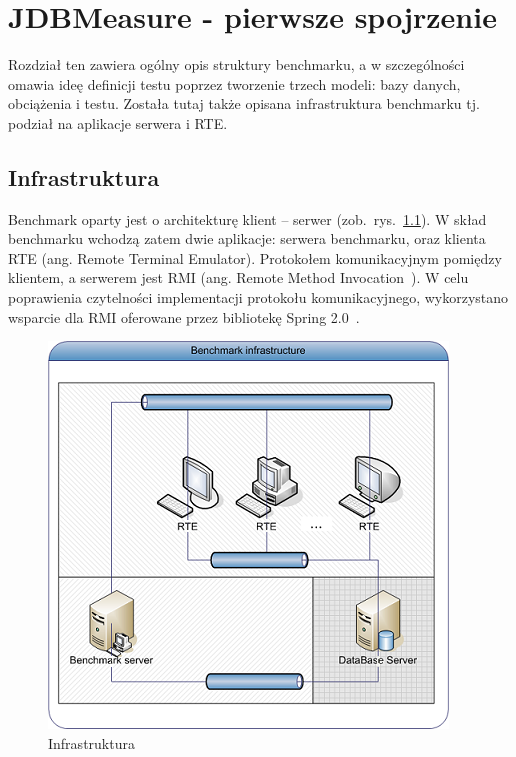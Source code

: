 \chapter{JDBMeasure - pierwsze spojrzenie}\label{rodz:over}
Rozdział ten zawiera ogólny opis struktury benchmarku, a w szczególności omawia ideę
definicji testu poprzez tworzenie trzech modeli: bazy danych, obciążenia i testu.
Została tutaj także opisana infrastruktura benchmarku tj. podział na aplikacje
serwera i RTE.
\section{Infrastruktura}
Benchmark oparty jest o architekturę klient -- serwer (zob.~rys.~\ref{rys:infrastructure}). 
W skład benchmarku wchodzą zatem dwie aplikacje: serwera benchmarku, oraz 
klienta RTE (ang. Remote Terminal Emulator). Protokołem komunikacyjnym pomiędzy 
klientem, a serwerem jest RMI (ang. Remote Method Invocation~\cite{RMI1}). 
W celu poprawienia czytelności implementacji protokołu komunikacyjnego, 
wykorzystano wsparcie dla RMI oferowane przez bibliotekę Spring 2.0~\cite{Spring1}.

\begin{figure}[h]
\begin{center}
\includegraphics[width=0.6\linewidth]{figures/infrastructure.png}
\end{center}
\caption{Infrastruktura}\label{rys:infrastructure}
\end{figure}

